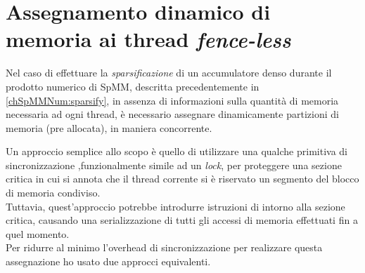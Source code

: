 \section{Assegnamento dinamico di memoria ai thread \emph{fence-less}} \label{chSpMMAux:atomicSegAssign}
Nel caso di effettuare la \emph{sparsificazione} di un accumulatore denso 
durante il prodotto numerico di SpMM, descritta precedentemente in \ref{chSpMMNum:sparsify},
in assenza di informazioni sulla quantità di memoria necessaria ad ogni thread, 
è necessario assegnare dinamicamente partizioni di memoria (pre allocata), in maniera concorrente.\\
\par\null\par
Un approccio semplice allo scopo è quello di utilizzare una qualche primitiva di sincronizzazione
,funzionalmente simile ad un \emph{lock}, per proteggere una sezione critica in cui
si annota che il thread corrente si è riservato un segmento del blocco di memoria condiviso.\\
Tuttavia, quest'approccio potrebbe introdurre istruzioni di  intorno alla sezione critica,
causando una serializzazione di tutti gli accessi di memoria effettuati fin a quel momento.\\
Per ridurre al minimo l'overhead di sincronizzazione per realizzare questa assegnazione
ho usato due approcci equivalenti.

